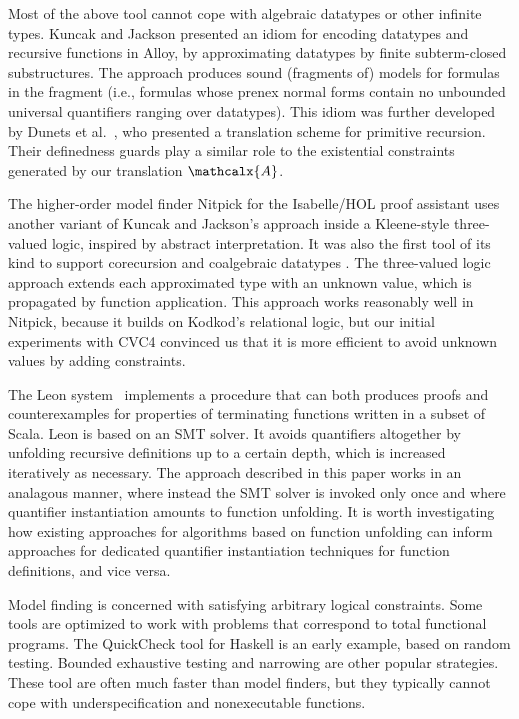 \documentclass[runningheads,a4paper]{llncs}
\newcommand\cvc{CVC4\xspace}
\newcommand{\conv}{\mathcalx{A}}
\begin{document}
Most of the above tool cannot cope with algebraic datatypes or other infinite
types. Kuncak and Jackson \cite{kuncak-jackson-2005} presented an idiom for
encoding datatypes and recursive functions in Alloy, by approximating datatypes
by finite subterm-closed substructures. The approach produces sound (fragments
of) models for formulas in the  fragment
(i.e., formulas whose prenex normal forms contain no unbounded universal
quantifiers ranging over datatypes). This idiom was further developed by Dunets
et al.\ \cite{dunets-et-al-2010}, who presented a translation scheme
for primitive recursion. Their definedness guards play a similar role to the
existential constraints generated by our translation $\conv$.

The higher-order model finder Nitpick for the Isabelle/HOL proof assistant uses
another variant of Kuncak and Jackson's approach inside a Kleene-style
three-valued logic, inspired by abstract interpretation. It was also the first
tool of its kind to support corecursion and coalgebraic datatypes
\cite{blanchette-2013-relational}. The three-valued logic approach extends each
approximated type with an unknown value, which is propagated by function
application. This approach works reasonably well in Nitpick, because it builds
on Kodkod's relational logic, but our initial experiments with \cvc convinced
us that it is more efficient to avoid unknown values by adding constraints.

The Leon system~\cite{blanc2013overview} implements a procedure that can both
produces proofs and counterexamples for properties of terminating functions
written in a subset of Scala. Leon is based on an SMT solver. It avoids
quantifiers altogether by unfolding recursive definitions up to a certain
depth, which is increased iteratively as necessary.
The approach described in this paper works in an analagous manner, 
where instead the SMT solver is invoked only once 
and where quantifier instantiation amounts to function unfolding. It is worth
investigating how existing approaches for algorithms based on function
unfolding can inform approaches for dedicated quantifier instantiation
techniques for function definitions, and vice versa.

Model finding is concerned with satisfying arbitrary logical constraints. Some
tools are optimized to work with problems that correspond to total functional
programs. The QuickCheck tool for Haskell \cite{claessen-hughes-2000} is an
early example, based
on random testing. Bounded exhaustive testing \cite{runciman-et-al-2008} and
narrowing \cite{lindblad-2008-testing} are other popular strategies. These tool
are often much faster than model finders, but they typically cannot cope with
underspecification and nonexecutable functions.
\end{document}
